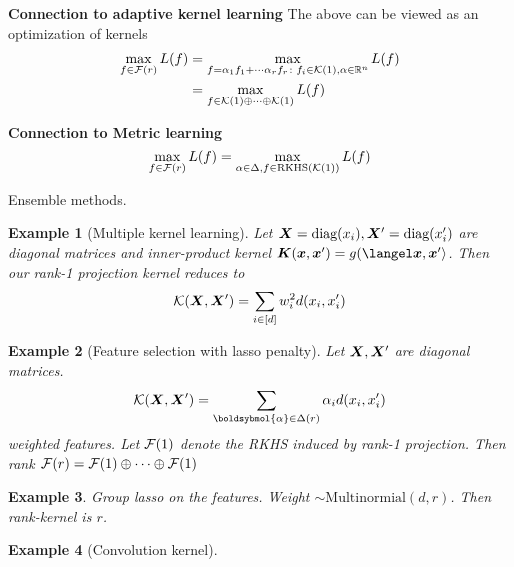 \documentclass[12pt]{article}
\newtheorem{example}{Example}
\begin{document}
{\bf Connection to adaptive kernel learning} The above can be viewed as an optimization of kernels 
\begin{align}
\max_{f\in \mathcal{F}(r)}L(f)&=\max_{f=\alpha_1 f_1+\cdots \alpha_r f_r\colon f_i\in\mathcal{K}(1), \alpha\in\mathbb{R}^n} L(f)\\
&=\max_{f\in \mathcal{K}(1)\oplus \cdots \oplus \mathcal{K}(1)}L(f)
\end{align}

{\bf Connection to Metric learning}
\[
\max_{f\in \mathcal{F}(r)}L(f)=\max_{\alpha \in \Delta, f\in \text{RKHS}(\mathcal{K}(1))} L(f)
\]

Ensemble methods. 

\begin{example} [Multiple kernel learning] Let $\bm X=\text{diag}(x_i),\bm X'=\text{diag}(x'_i)$ are diagonal matrices and inner-product kernel $\mK(\mx,\mx')=g(\langel\mx,\mx'\rangle$. Then our rank-1 projection kernel reduces to
\[
\mathcal{K}(\bm X,\bm X')=\sum_{i\in[d]} w^2_{i}d(x_i,x'_i) 
\]
\end{example}

\begin{example}[Feature selection with lasso penalty] Let $\bm X,\bm X'$ are diagonal matrices. 
\[
\tK(\mX,\mX')=\sum_{\boldsybmol{\alpha}\in \Delta(r)}\alpha_id(x_i,x'_i)
\]
weighted features. 
Let $\mathcal{F}(1)$ denote the RKHS induced by rank-1 projection. Then rank $\mathcal{F}(r)=\mathcal{F}(1)\oplus\cdots\oplus\mathcal{F}(1)$
\end{example} 

\begin{example} Group lasso on the features. Weight $\sim \text{Multinormial}(d,r)$. Then rank-kernel is $r$.
\end{example}

\begin{example}[Convolution kernel]
\end{example}
\end{document}
